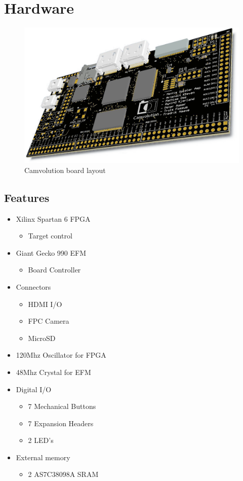 \section{Hardware}
\begin{figure}
    \includegraphics[width=\linewidth]{img/OverviewCamvolutionKit}
    \caption{Camvolution board layout}
    \label{fig:board_layout}
\end{figure}

\subsection{Features}
\begin{itemize}
    \item Xilinx Spartan 6 FPGA
        \begin{itemize}
            \item Target control
        \end{itemize}
    \item Giant Gecko 990 EFM
        \begin{itemize}
            \item Board Controller
        \end{itemize}
    \item Connectors
        \begin{itemize}
            \item HDMI I/O
            \item FPC Camera
            \item MicroSD
        \end{itemize}
    \item 120Mhz Oscillator for FPGA
    \item 48Mhz Crystal for EFM
    \item Digital I/O
        \begin{itemize}
            \item 7 Mechanical Buttons
            \item 7 Expansion Headers
            \item 2 LED's
        \end{itemize}
    \item External memory
        \begin{itemize}
            \item 2 AS7C38098A SRAM
        \end{itemize}

\end{itemize}



